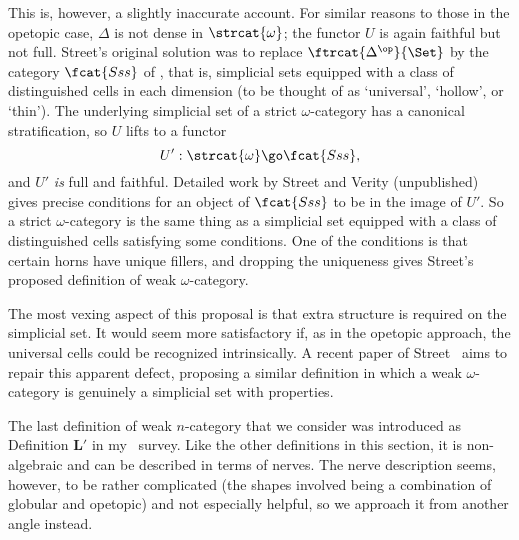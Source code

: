 This is, however, a slightly inaccurate account.  For similar reasons to
those in the opetopic case, $\Delta$ is not dense in $\strcat{\omega}$; the
functor $U$ is again faithful but not full.  Street's original solution was
to replace $\ftrcat{\Delta^\op}{\Set}$ by the category $\fcat{Sss}$ of
, that is, simplicial sets equipped with
a class of distinguished cells in each dimension (to be thought of as
`universal',%
%
%
`hollow',%
%
%
or `thin').%
%
%
 The underlying simplicial set of a
strict $\omega$-category has a canonical stratification, so $U$ lifts to a
functor
\[
U': \strcat{\omega} \go \fcat{Sss},
\]
and $U'$ \emph{is} full and faithful.  Detailed work by Street
\cite{StrAOS,StrFN} and Verity%
%
%
(unpublished) gives precise conditions for
an object of $\fcat{Sss}$ to be in the image of $U'$.  So a strict
$\omega$-category is the same thing as a simplicial set equipped with a
class of distinguished cells satisfying some conditions.  One of the
conditions is that certain horns have unique fillers, and dropping the
uniqueness gives Street's proposed definition of weak $\omega$-category.

The most vexing aspect of this proposal is that extra structure is required
on the simplicial set.  It would seem more satisfactory if, as in the
opetopic approach, the universal cells could be recognized intrinsically.
A recent paper of Street~\cite{StrWOC} aims to repair this apparent defect,
proposing a similar definition in which a weak $\omega$-category is
genuinely a simplicial set with properties.%
%
%
%
%
%
%
%





%
%
%
%
%
%
%
%
%

The last definition of weak $n$-category that we consider was introduced as
Definition $\mathbf{L'}$ in my~\cite{SDN} survey.  Like the other
definitions in this section, it is non-algebraic and can be described in
terms of nerves.  The nerve description seems, however, to be rather
complicated (the shapes involved being a combination of globular and
opetopic) and not especially helpful, so we approach it from another
angle instead.  

